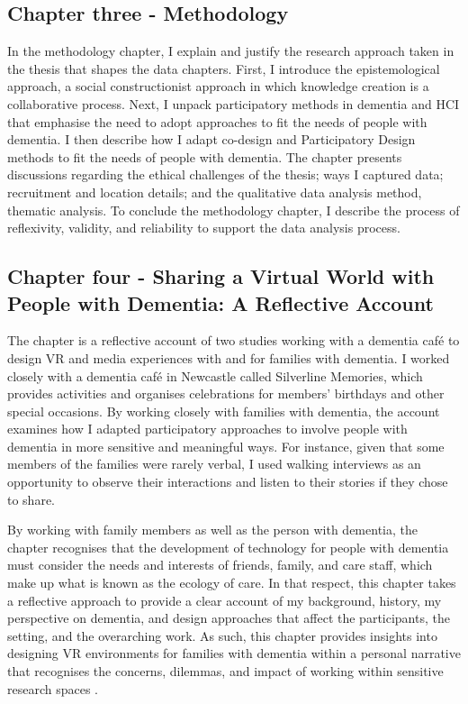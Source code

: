 \subsection{Chapter three - Methodology}
\label{Intro:ChapterThree}
In the methodology chapter, I explain and justify the research approach taken in the thesis that shapes the data chapters. First, I introduce the epistemological approach, a social constructionist approach in which knowledge creation is a collaborative process. Next, I unpack participatory methods in dementia and HCI that emphasise the need to adopt approaches to fit the needs of people with dementia. I then describe how I adapt co-design and Participatory Design methods to fit the needs of people with dementia. The chapter presents discussions regarding the ethical challenges of the thesis; ways I captured data; recruitment and location details; and the qualitative data analysis method, thematic analysis. To conclude the methodology chapter, I describe the process of reflexivity, validity, and reliability to support the data analysis process. 
\subsection{Chapter four - Sharing a Virtual World with People with Dementia: A Reflective Account}
\label{Intro:ChapterFour}
The chapter is a reflective account of two studies working with a dementia café to design VR and media experiences with and for families with dementia. I worked closely with a dementia café in Newcastle called Silverline Memories, which provides activities and organises celebrations for members’ birthdays and other special occasions. By working closely with families with dementia, the account examines how I adapted participatory approaches to involve people with dementia in more sensitive and meaningful ways. For instance, given that some members of the families were rarely verbal, I used walking interviews \citep{kullberg2017walking} as an opportunity to observe their interactions and listen to their stories if they chose to share. 

By working with family members as well as the person with dementia, the chapter recognises that the development of technology for people with dementia must consider the needs and interests of friends, family, and care staff, which make up what is known as the ecology of care. In that respect, this chapter takes a reflective approach to provide a clear account of my background, history, my perspective on dementia, and design approaches that affect the participants, the setting, and the overarching work. As such, this chapter provides insights into designing VR environments for families with dementia within a personal narrative that recognises the concerns, dilemmas, and impact of working within sensitive research spaces \citep{england_getting_1994}.

